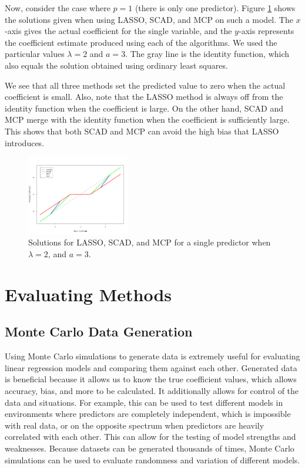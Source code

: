 \documentclass{article}
\begin{document}
Now, consider the case where $p=1$ (there is only one predictor). Figure \ref{fig:prediction} shows the solutions given when using LASSO, SCAD, and MCP on such a model. The $x$-axis gives the actual coefficient for the single variable, and the $y$-axis represents the coefficient estimate produced using each of the algorithms. We used the particular values $\lambda = 2$ and $a = 3$. The gray line is the identity function, which also equals the solution obtained using ordinary least squares.

We see that all three methods set the predicted value to zero when the actual coefficient is small. Also, note that the LASSO method is always off from the identity function when the coefficient is large. On the other hand, SCAD and MCP merge with the identity function when the coefficient is sufficiently large. This shows that both SCAD and MCP can avoid the high bias that LASSO introduces.

\begin{figure}[!h]
	\centering
	\caption{Solutions for LASSO, SCAD, and MCP for a single predictor when $\lambda=2$, and $a = 3$.}
	\label{fig:prediction}
	\includegraphics[width = 0.4\textwidth]{images/prediction.png}
\end{figure}

\section{Evaluating Methods}
\subsection{Monte Carlo Data Generation}
Using Monte Carlo simulations to generate data is extremely useful for evaluating linear regression models and comparing them against each other. Generated data is beneficial because it allows us to know the true coefficient values, which allows accuracy, bias, and more to be calculated. It additionally allows for control of the data and situations. For example, this can be used to test different models in environments where predictors are completely independent, which is impossible with real data, or on the opposite spectrum when predictors are heavily correlated with each other. This can allow for the testing of model strengths and weaknesses. Because datasets can be generated thousands of times, Monte Carlo simulations can be used to evaluate randomness and variation of different models.
\end{document}
